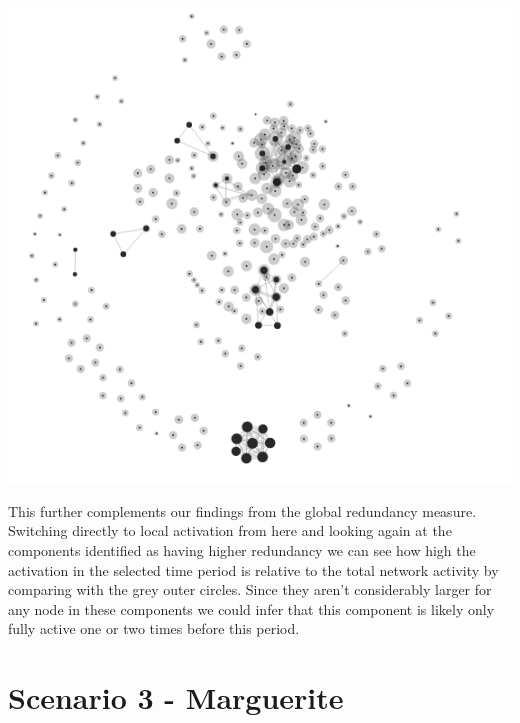 \begin{center}
\includegraphics[trim={0 0 0 0}, width=140mm]{./Figures/TurinLocalActivation.png}
\end{center}
This further complements our findings from the global redundancy measure. Switching directly to local activation from here and looking again at the components identified as having higher redundancy we can see how high the activation in the selected time period is relative to the total network activity by comparing with the grey outer circles. Since they aren't considerably larger for any node in these components we could infer that this component is likely only fully active one or two times before this period.

\section{Scenario 3 - Marguerite} 

